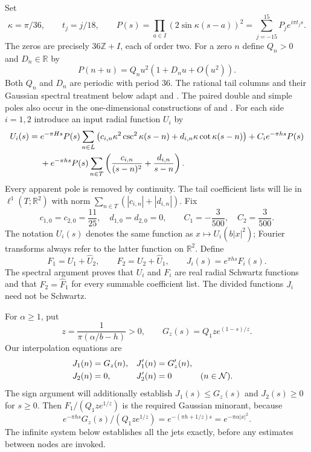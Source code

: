 \documentclass[11pt]{article}
\theoremstyle{remark}\newtheorem{remark}[theorem]{Remark}
\begin{document}
Set
\[
 \kappa=\pi/36,\qquad t_j=j/18,\qquad
 P(s)=\prod_{a\in I}(2\sin\kappa(s-a))^2
      =\sum_{j=-15}^{15}P_j e^{i\pi t_js}.
\]
The zeros are precisely $36\mathbb Z+I$, each of order two.
For a zero $n$ define $Q_n>0$ and $D_n\in\mathbb R$ by
\begin{equation}
 P(n+u)=Q_nu^2(1+D_nu+O(u^2)).
 \label{analytic:local-product}
\end{equation}
Both $Q_n$ and $D_n$ are periodic with period $36$.
The rational tail columns and their Gaussian spectral treatment below
adapt \cite[Lemma~2.1 and Proposition~2.2]{SharpPlanar2026} and
\cite[Lemmas~2.2 and~2.4]{UniversalTriangular2026}.
The paired double and simple poles also occur in the one-dimensional
constructions of \cite[Proposition~9.6]{CohnKumar2007} and
\cite[formulas~(1.2)--(1.3)]{CarneiroLittmannVaaler2013}.
For each side $i=1,2$ introduce an input radial function $U_i$ by
\begin{align}
 U_i(s)={}&e^{-\pi Hs}P(s)\sum_{n\in L}
 \left(c_{i,n}\kappa^2\csc^2\kappa(s-n)
                 +d_{i,n}\kappa\cot\kappa(s-n)\right)
       +C_i e^{-\pi hs}P(s)\notag\\
 &+e^{-\pi hs}P(s)\sum_{n\in T}
 \left(\frac{c_{i,n}}{(s-n)^2}+\frac{d_{i,n}}{s-n}\right).
 \label{analytic:input-functions}
\end{align}
Every apparent pole is removed by continuity. The tail coefficient
lists will lie in $\ell^1(T;\mathbb R^2)$ with norm
$\sum_{n\in T}(|c_{i,n}|+|d_{i,n}|)$. Fix
\[
 c_{1,0}=c_{2,0}=\frac{11}{25},\quad
 d_{1,0}=d_{2,0}=0,\qquad
 C_1=-\frac3{500},\quad C_2=\frac3{500}.
\]
The notation $U_i(s)$ denotes the same function as
$x\mapsto U_i(b|x|^2)$; Fourier transforms always refer to the
latter function on $\mathbb R^2$. Define
\[
 F_1=U_1+\widehat U_2,\qquad F_2=U_2+\widehat U_1,
 \qquad J_i(s)=e^{\pi hs}F_i(s).
\]
The spectral argument proves that $U_i$ and $F_i$ are real radial
Schwartz functions and that $F_2=\widehat F_1$ for every summable
coefficient list. The divided functions $J_i$ need not be Schwartz.

For $\alpha\ge1$, put
\[
 z=\frac1{\pi(\alpha/b-h)}>0,
 \qquad G_z(s)=Q_1z e^{(1-s)/z}.
\]
Our interpolation equations are
\begin{align}
 J_1(n)&=G_z(n),& J_1'(n)&=G_z'(n),\notag\\
 J_2(n)&=0,& J_2'(n)&=0
       &&(n\in\mathcal N).
 \label{analytic:all-positive-jets}
\end{align}
The sign argument will additionally establish
$J_1(s)\le G_z(s)$ and $J_2(s)\ge0$ for $s\ge0$.
Then $F_1/(Q_1ze^{1/z})$ is the required Gaussian minorant, because
\[
 e^{-\pi hs}G_z(s)/(Q_1ze^{1/z})
 =e^{-(\pi h+1/z)s}=e^{-\pi\alpha|x|^2}.
\]
The infinite system below establishes all the jets exactly, before
any estimates between nodes are invoked.
\end{document}
